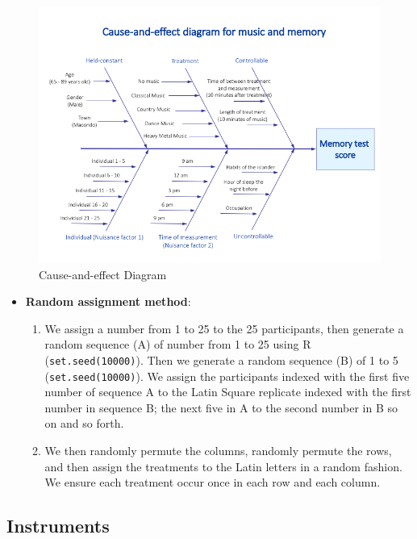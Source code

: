\documentclass[]{article}
\providecommand{\tightlist}{%
  \setlength{\itemsep}{0pt}\setlength{\parskip}{0pt}}
\begin{document}
\begin{figure}
\centering
\includegraphics{Diagram.png}
\caption{Cause-and-effect Diagram}
\end{figure}

\begin{itemize}
\tightlist
\item
  \textbf{Random assignment method}:

  \begin{enumerate}
  \def\labelenumi{(\arabic{enumi})}
  \tightlist
  \item
    We assign a number from 1 to 25 to the 25 participants, then
    generate a random sequence (A) of number from 1 to 25 using R
    (\texttt{set.seed(10000)}). Then we generate a random sequence (B)
    of 1 to 5 (\texttt{set.seed(10000)}). We assign the participants
    indexed with the first five number of sequence A to the Latin Square
    replicate indexed with the first number in sequence B; the next five
    in A to the second number in B so on and so forth.
  \item
    We then randomly permute the columns, randomly permute the rows, and
    then assign the treatments to the Latin letters in a random fashion.
    We ensure each treatment occur once in each row and each column.
  \end{enumerate}
\end{itemize}

\subsection{Instruments}\label{instruments}
\end{document}

